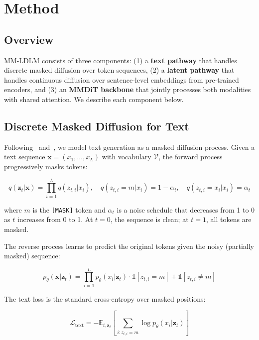 \documentclass{article}
\begin{document}
\section{Method}\label{sec:method}

\subsection{Overview}

MM-LDLM consists of three components: (1) a \textbf{text pathway} that handles discrete masked diffusion over token sequences, (2) a \textbf{latent pathway} that handles continuous diffusion over sentence-level embeddings from pre-trained encoders, and (3) an \textbf{MMDiT backbone} that jointly processes both modalities with shared attention. We describe each component below.

\subsection{Discrete Masked Diffusion for Text}

Following~\citet{sahoo2024simple} and~\citet{lou2024mdlm}, we model text generation as a masked diffusion process. Given a text sequence $\mathbf{x} = (x_1, \ldots, x_L)$ with vocabulary $\mathcal{V}$, the forward process progressively masks tokens:

\begin{equation}
    q(\mathbf{z}_t | \mathbf{x}) = \prod_{i=1}^{L} q(z_{t,i} | x_i), \quad
    q(z_{t,i} = m | x_i) = 1 - \alpha_t, \quad
    q(z_{t,i} = x_i | x_i) = \alpha_t
\end{equation}

where $m$ is the \texttt{[MASK]} token and $\alpha_t$ is a noise schedule that decreases from 1 to 0 as $t$ increases from 0 to 1. At $t=0$, the sequence is clean; at $t=1$, all tokens are masked.

The reverse process learns to predict the original tokens given the noisy (partially masked) sequence:

\begin{equation}
    p_\theta(\mathbf{x} | \mathbf{z}_t) = \prod_{i=1}^{L} p_\theta(x_i | \mathbf{z}_t) \cdot \mathds{1}[z_{t,i} = m] + \mathds{1}[z_{t,i} \neq m]
\end{equation}

The text loss is the standard cross-entropy over masked positions:

\begin{equation}
    \mathcal{L}_{\text{text}} = -\mathbb{E}_{t, \mathbf{z}_t} \left[ \sum_{i: z_{t,i} = m} \log p_\theta(x_i | \mathbf{z}_t) \right]
\end{equation}
\end{document}

